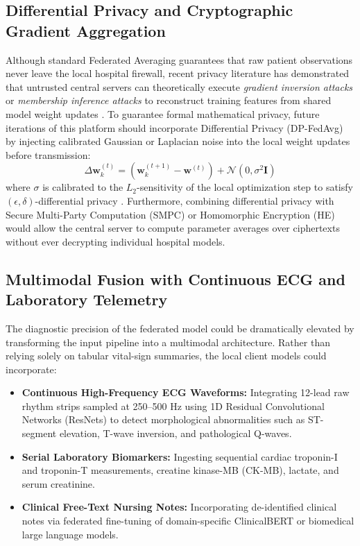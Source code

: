 \subsection{Differential Privacy and Cryptographic Gradient Aggregation}
Although standard Federated Averaging guarantees that raw patient observations never leave the local hospital firewall, recent privacy literature has demonstrated that untrusted central servers can theoretically execute \textit{gradient inversion attacks} or \textit{membership inference attacks} to reconstruct training features from shared model weight updates \citep{shokri2017membership}. To guarantee formal mathematical privacy, future iterations of this platform should incorporate Differential Privacy (DP-FedAvg) by injecting calibrated Gaussian or Laplacian noise into the local weight updates before transmission:
\begin{equation}
    \Delta \mathbf{w}_k^{(t)} = \left(\mathbf{w}_k^{(t+1)} - \mathbf{w}^{(t)}\right) + \mathcal{N}\left(0, \sigma^2 \mathbf{I}\right)
\end{equation}
where $\sigma$ is calibrated to the $L_2$-sensitivity of the local optimization step to satisfy $(\epsilon, \delta)$-differential privacy \citep{dwork2014algorithmic}. Furthermore, combining differential privacy with Secure Multi-Party Computation (SMPC) or Homomorphic Encryption (HE) would allow the central server to compute parameter averages over ciphertexts without ever decrypting individual hospital models.

\subsection{Multimodal Fusion with Continuous ECG and Laboratory Telemetry}
The diagnostic precision of the federated model could be dramatically elevated by transforming the input pipeline into a multimodal architecture. Rather than relying solely on tabular vital-sign summaries, the local client models could incorporate:
\begin{itemize}
    \item \textbf{Continuous High-Frequency ECG Waveforms:} Integrating 12-lead raw rhythm strips sampled at 250--500 Hz using 1D Residual Convolutional Networks (ResNets) to detect morphological abnormalities such as ST-segment elevation, T-wave inversion, and pathological Q-waves.
    \item \textbf{Serial Laboratory Biomarkers:} Ingesting sequential cardiac troponin-I and troponin-T measurements, creatine kinase-MB (CK-MB), lactate, and serum creatinine.
    \item \textbf{Clinical Free-Text Nursing Notes:} Incorporating de-identified clinical notes via federated fine-tuning of domain-specific ClinicalBERT or biomedical large language models.
\end{itemize}

